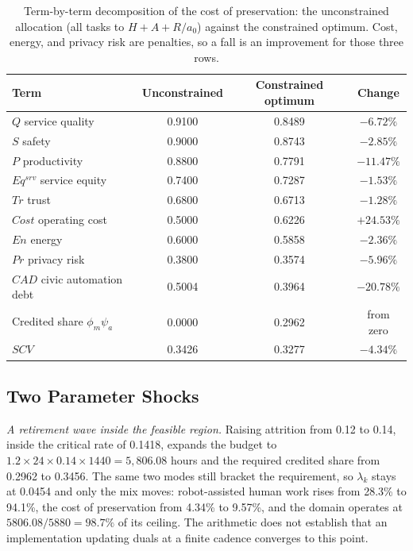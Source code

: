 \documentclass[utf8]{frontiers_suppmat}
\begin{document}
\begin{table}[!htbp]
	\caption{Term-by-term decomposition of the cost of preservation: the unconstrained allocation (all tasks to $H{+}A{+}R/a_0$) against the constrained optimum. Cost, energy, and privacy risk are penalties, so a fall is an improvement for those three rows.}
	\label{tab:worked-decomp}
	\small
	\begin{tabular}{@{}lccc@{}}
		\toprule
		\textbf{Term} & \textbf{Unconstrained} & \textbf{Constrained optimum} & \textbf{Change}\\
		\midrule
		$Q$ service quality & 0.9100 & 0.8489 & $-6.72\%$\\
		$S$ safety & 0.9000 & 0.8743 & $-2.85\%$\\
		$P$ productivity & 0.8800 & 0.7791 & $-11.47\%$\\
		$Eq^{srv}$ service equity & 0.7400 & 0.7287 & $-1.53\%$\\
		$Tr$ trust & 0.6800 & 0.6713 & $-1.28\%$\\
		$Cost$ operating cost & 0.5000 & 0.6226 & $+24.53\%$\\
		$En$ energy & 0.6000 & 0.5858 & $-2.36\%$\\
		$Pr$ privacy risk & 0.3800 & 0.3574 & $-5.96\%$\\
		$CAD$ civic automation debt & 0.5004 & 0.3964 & $-20.78\%$\\
		\midrule
		Credited share $\phi_m\psi_a$ & 0.0000 & 0.2962 & from zero\\
		$SCV$ & 0.3426 & 0.3277 & $-4.34\%$\\
		\bottomrule
	\end{tabular}
\end{table}

\subsection{Two Parameter Shocks}
\label{app:shocks}

\textit{A retirement wave inside the feasible region.} Raising attrition from 0.12 to 0.14, inside the critical rate of 0.1418, expands the budget to $1.2\times24\times0.14\times1440=5{,}806.08$ hours and the required credited share from 0.2962 to 0.3456. The same two modes still bracket the requirement, so $\lambda_k$ stays at 0.0454 and only the mix moves: robot-assisted human work rises from 28.3\% to 94.1\%, the cost of preservation from 4.34\% to 9.57\%, and the domain operates at $5806.08/5880=98.7\%$ of its ceiling. The arithmetic does not establish that an implementation updating duals at a finite cadence converges to this point.
\end{document}
